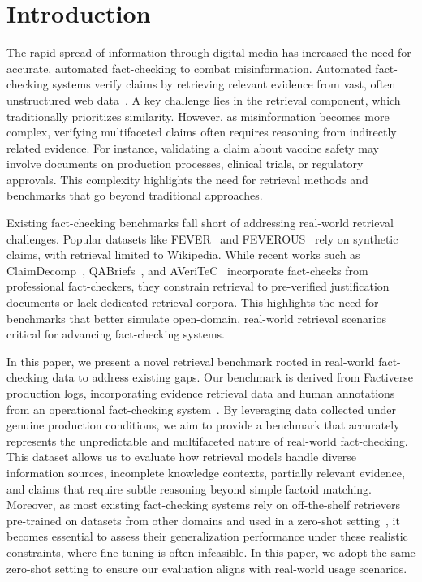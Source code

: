\section{Introduction}
The rapid spread of information through digital media has increased the need for accurate, automated fact-checking to combat misinformation. Automated fact-checking systems verify claims by retrieving relevant evidence from vast, often unstructured web data~\cite{guo2022survey,schlichtkrull2023averitec}. A key challenge lies in the retrieval component, which traditionally prioritizes similarity. However, as misinformation becomes more complex, verifying multifaceted claims often requires reasoning from indirectly related evidence. For instance, validating a claim about vaccine safety may involve documents on production processes, clinical trials, or regulatory approvals. This complexity highlights the need for retrieval methods and benchmarks that go beyond traditional approaches.

Existing fact-checking benchmarks fall short of addressing real-world retrieval challenges. Popular datasets like FEVER~\cite{thorne-etal-2018-fever} and FEVEROUS~\cite{aly2021feverous} rely on synthetic claims, with retrieval limited to Wikipedia. While recent works such as ClaimDecomp~\cite{claimdecomp}, QABriefs~\cite{QABriefs}, and AVeriTeC~\cite{schlichtkrull2023averitec} incorporate fact-checks from professional fact-checkers, they constrain retrieval to pre-verified justification documents or lack dedicated retrieval corpora. This highlights the need for benchmarks that better simulate open-domain, real-world retrieval scenarios critical for advancing fact-checking systems.

In this paper, we present a novel retrieval benchmark rooted in real-world fact-checking data to address existing gaps. Our benchmark is derived from Factiverse production logs, incorporating evidence retrieval data and human annotations from an operational fact-checking system~\cite{10.1145/3626772.3657663,10.1145/3626772.3661361}. By leveraging data collected under genuine production conditions, we aim to provide a benchmark that accurately represents the unpredictable and multifaceted nature of real-world fact-checking. This dataset allows us to evaluate how retrieval models handle diverse information sources, incomplete knowledge contexts, partially relevant evidence, and claims that require subtle reasoning beyond simple factoid matching. Moreover, as most existing fact-checking systems rely on off-the-shelf retrievers pre-trained on datasets from other domains and used in a zero-shot setting~\cite{sriram-etal-2024-contrastive,gupta-etal-2022-dialfact}, it becomes essential to assess their generalization performance under these realistic constraints, where fine-tuning is often infeasible. In this paper, we adopt the same zero-shot setting to ensure our evaluation aligns with real-world usage scenarios.

